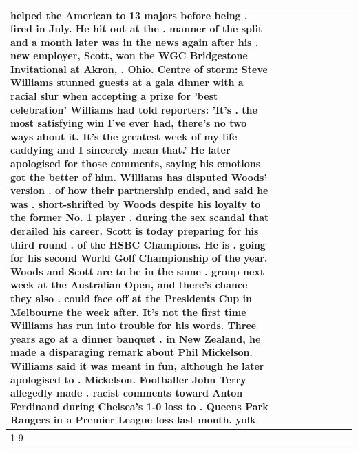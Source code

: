 \begin{table}[H]
\begin{tabular}{lllrlllll}
helped the American to 13 majors before being . fired in July. He hit out at the . manner of the split and a month later was in the news again after his . new employer, Scott, won the WGC Bridgestone Invitational at Akron, . Ohio. Centre of storm: Steve Williams stunned guests at a gala dinner with a racial slur when accepting a prize for 'best celebration' Williams had told reporters: 'It's . the most satisfying win I've ever had, there's no two ways about it. It's the greatest week of my life caddying and I sincerely mean that.' He later apologised for those comments, saying his emotions got the better of him. Williams has disputed Woods' version . of how their partnership ended, and said he was . short-shrifted by Woods despite his loyalty to the former No. 1 player . during the sex scandal that derailed his career. Scott is today preparing for his third round . of the HSBC Champions. He is . going for his second World Golf Championship of the year. Woods and Scott are to be in the same . group next week at the Australian Open, and there's chance they also . could face off at the Presidents Cup in Melbourne the week after. It's not the first time Williams has run into trouble for his words. Three years ago at a dinner banquet . in New Zealand, he made a disparaging remark about Phil Mickelson. Williams said it was meant in fun, although he later apologised to . Mickelson. Footballer John Terry allegedly made . racist comments toward Anton Ferdinand during Chelsea's 1-0 loss to . Queens Park Rangers in a Premier League loss last month. yolk \\
\cline{1-9}

\end{tabular}
\end{table}
